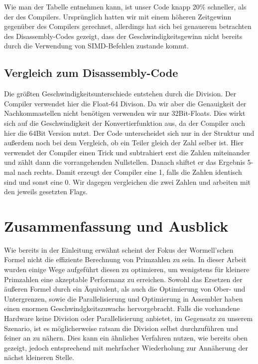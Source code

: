 \documentclass[11pt]{scrartcl}
\begin{document}
Wie man der Tabelle entnehmen kann, ist unser Code knapp 20\% schneller, als der des Compilers. Ursprünglich hatten wir mit einem höheren Zeitgewinn gegenüber des Compilers gerechnet, allerdings hat sich bei genauerem betrachten des Disassembly-Codes gezeigt, dass der Geschwindigkeitsgewinn nicht bereits durch die Verwendung von SIMD-Befehlen zustande kommt.

\subsection{Vergleich zum Disassembly-Code}
Die größten Geschwindigkeitsunterschiede entstehen durch die Division. Der Compiler verwendet hier die Float-64 Divison. Da wir aber die Genauigkeit der Nachkommastellen nicht benötigen verwenden wir nur 32Bit-Floats. Dies wirkt sich auf die Geschwindigkeit der Konvertierfunktion aus, da der Compiler auch hier die 64Bit Version nutzt. Der Code unterscheidet sich nur in der Struktur und außerdem noch bei dem Vergleich, ob ein Teiler gleich der Zahl selber ist.
Hier verwendet der Compiler einen Trick und subtrahiert erst die Zahlen miteinander und zählt dann die vorrangehenden Nullstellen. Danach shiftet er das Ergebnis 5-mal nach rechts. Damit erzeugt der Compiler eine 1, falls die Zahlen identisch sind und sonst eine 0. Wir dagegen vergleichen die zwei Zahlen und arbeiten mit den jeweils gesetzten Flags.
\section{Zusammenfassung und Ausblick}
\label{Ausblick}

Wie bereits in der Einleitung erwähnt scheint der Fokus der Wormell'schen Formel nicht die effiziente Berechnung von Primzahlen zu sein. In dieser Arbeit wurden einige Wege aufgeführt diesen zu optimieren, um wenigstens für kleinere Primzahlen eine akzeptable Performanz zu erreichen. Sowohl das Ersetzen der äußeren Formel durch ein Äquivalent, als auch die Optimierung von Ober- und Untergrenzen, sowie die Parallelisierung und Optimierung in Assembler haben einen enormen Geschwindgkeitszuwachs hervorgebracht. Falls die vorhandene Hardware keine Division oder Parallelisierung anbietet, im Gegensatz zu unserem Szenario, ist es möglicherweise ratsam die Division selbst durchzuführen und feiner an zu nähern. Dies kann ein ähnliches Verfahren nutzen, wie bereits oben gezeigt, jedoch entsprechend mit mehrfacher Wiederholung zur Annäherung der nächst kleineren Stelle.

\paragraph{}
\end{document}
